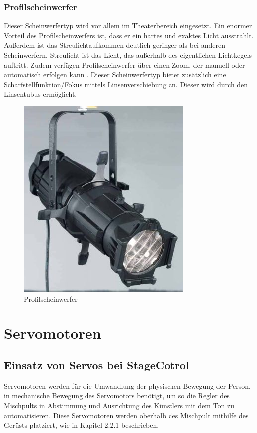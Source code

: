 \newpage
\subsubsection{Profilscheinwerfer}
Dieser Scheinwerfertyp wird vor allem im Theaterbereich eingesetzt. Ein enormer Vorteil des Profilscheinwerfers ist, dass er ein hartes und exaktes Licht ausstrahlt. Außerdem ist das Streulichtaufkommen deutlich geringer als bei anderen Scheinwerfern. Streulicht ist das Licht, das außerhalb des eigentlichen Lichtkegels auftritt. Zudem verfügen Profilscheinwerfer über einen Zoom, der manuell oder automatisch erfolgen kann \parencite{Profilscheinwerfer}. Dieser Scheinwerfertyp bietet zusätzlich eine Scharfstellfunktion/Fokus mittels Linsenverschiebung an. Dieser wird durch den Linsentubus ermöglicht.\\


\begin{figure}[H]
	\centering
	\includegraphics[width=0.4\linewidth]{images/Profilscheinwerfer.jpg}
	\caption[Profilscheinwerfer]{Profilscheinwerfer}
	\label{fig:Profilscheinwerfer}
\end{figure}

\section{Servomotoren}
\subsection{Einsatz von Servos bei StageCotrol}
Servomotoren werden für die Umwandlung der physischen Bewegung der Person, in mechanische Bewegung des Servomotors benötigt, um so die Regler des Mischpults in Abstimmung und Ausrichtung des Künstlers mit dem Ton zu automatisieren. Diese Servomotoren werden oberhalb des Mischpult mithilfe des Gerüsts platziert, wie in Kapitel 2.2.1 beschrieben.

\newpage
